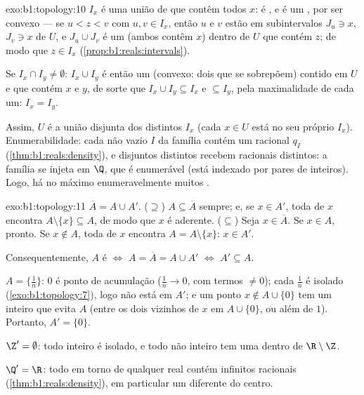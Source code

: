 \begin{solution}{exo:b1:topology:10}
$I_x$ é uma união de   que contêm todos $x$: é ,
e é um , por ser convexo --- se $u < z < v$ com $u, v \in
I_x$, então $u$ e $v$ estão em subintervalos  $J_u \ni x$, $J_v \ni
x$ de $U$, e $J_u \cup J_v$ é um  (ambos contêm $x$)
dentro de $U$ que contém $z$; de modo que $z \in I_x$
(\cref{prop:b1:reals:intervals}).

Se $I_x \cap I_y \neq \emptyset$: $I_x \cup I_y$ é então um 
 (convexo: dois  que se sobrepõem) contido em $U$ e
que contém $x$ e $y$, de sorte que $I_x \cup I_y \subseteq I_x$ e
$\subseteq I_y$, pela maximalidade de cada um: $I_x = I_y$.

Assim, $U$ é a união disjunta dos  distintos $I_x$ (cada $x \in
U$ está no seu próprio $I_x$). Enumerabilidade: cada  
não vazio $I$ da família contém um racional $q_I$
(\cref{thm:b1:reals:density}), e  disjuntos distintos recebem
racionais distintos: a família se injeta em $\Q$, que é enumerável
(está indexado por pares de inteiros). Logo, há no máximo
enumeravelmente muitos .
\end{solution}

\begin{solution}{exo:b1:topology:11}
$\overline A = A \cup A'$. ($\supseteq$) $A \subseteq \overline
A$ sempre; e, se $x \in A'$, toda  de $x$ encontra $A
\setminus \{x\} \subseteq A$, de modo que $x$ é aderente. ($\subseteq$)
Seja $x \in \overline A$. Se $x \in A$, pronto. Se $x \notin A$,
toda  de $x$ encontra $A = A \setminus \{x\}$: $x \in
A'$.

Consequentemente, $A$ é  $\iff$ $A = \overline A = A \cup A'$
$\iff$ $A' \subseteq A$.

$A = \{\frac 1n\}$: $0$ é ponto de acumulação ($\frac 1n \to
0$, com termos $\neq 0$); cada $\frac 1n$ é isolado
(\cref{exo:b1:topology:7}), logo não está em $A'$; e um ponto $x
\notin A \cup \{0\}$ tem um  inteiro que evita $A$ (entre
os dois vizinhos de $x$ em $A \cup \{0\}$, ou além de $1$).
Portanto, $A' = \{0\}$.

$\Z' = \emptyset$: todo inteiro é isolado, e todo não inteiro
tem uma  dentro de $\R \setminus \Z$.

$\Q' = \R$: todo  em torno de qualquer real contém infinitos
racionais (\cref{thm:b1:reals:density}), em particular um
diferente do centro.
\end{solution}

